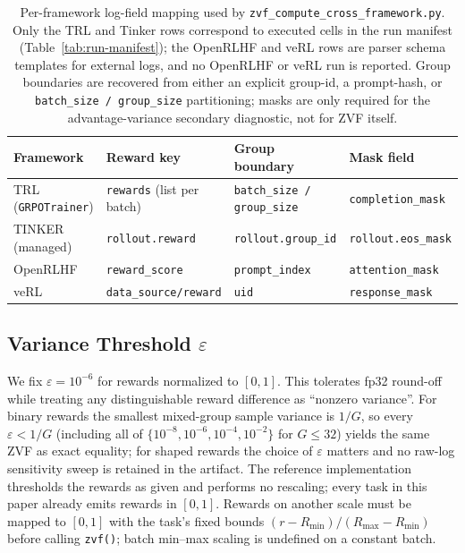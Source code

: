 \begin{table}[ht]
\centering
\small
\begin{tabular}{llll}
\toprule
Framework & Reward key & Group boundary & Mask field \\
\midrule
TRL (\texttt{GRPOTrainer})   & \texttt{rewards} (list per batch) & \texttt{batch\_size / group\_size} & \texttt{completion\_mask} \\
TINKER (managed)             & \texttt{rollout.reward}           & \texttt{rollout.group\_id}         & \texttt{rollout.eos\_mask} \\
OpenRLHF                     & \texttt{reward\_score}            & \texttt{prompt\_index}             & \texttt{attention\_mask}   \\
veRL                         & \texttt{data\_source/reward}      & \texttt{uid}                        & \texttt{response\_mask}   \\
\bottomrule
\end{tabular}
\caption{Per-framework log-field mapping used by
\texttt{zvf\_compute\_cross\_framework.py}. Only the TRL and Tinker rows
correspond to executed cells in the run manifest
(Table~\ref{tab:run-manifest}); the OpenRLHF and veRL rows are parser schema
templates for external logs, and no OpenRLHF or veRL run is reported. Group boundaries are recovered
from either an explicit group-id, a prompt-hash, or
\texttt{batch\_size / group\_size} partitioning; masks are only required
for the advantage-variance secondary diagnostic, not for ZVF itself.}
\label{tab:zvf-parser-fields}
\end{table}

\subsection{Variance Threshold \texorpdfstring{$\varepsilon$}{epsilon}}

We fix $\varepsilon = 10^{-6}$ for rewards normalized to $[0,1]$. This
tolerates fp32 round-off while treating any distinguishable reward
difference as ``nonzero variance''. For binary rewards the smallest
mixed-group sample variance is $1/G$, so every $\varepsilon<1/G$ (including
all of $\{10^{-8},10^{-6},10^{-4},10^{-2}\}$ for $G\le 32$) yields the same
ZVF as exact equality; for shaped rewards the choice of $\varepsilon$ matters
and no raw-log sensitivity sweep is retained in the artifact. The reference implementation thresholds
the rewards as given and performs no rescaling; every task in this paper already
emits rewards in $[0,1]$. Rewards on another scale must be mapped to $[0,1]$ with
the task's fixed bounds $(r-R_{\min})/(R_{\max}-R_{\min})$ before calling
\texttt{zvf()}; batch min--max scaling is undefined on a constant batch.

